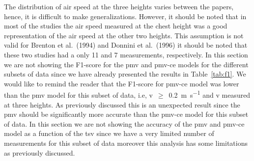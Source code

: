 The distribution of air speed at the three heights varies between the papers, hence, it is difficult to make generalizations.
However, it should be noted that in most of the studies the air speed measured at the chest height was a good representation of the air speed at the other two heights.
This assumption is not valid for Brenton et al.\ (1994) and Donnini et al.\ (1996) it should be noted that these two studies had a only \num{11} and \num{7} measurements, respectively.
In this section we are not showing the F1-score for the \ac{pmv} and \ac{pmv-ce} models for the different subsets of data since we have already presented the results in Table~\ref{tab:f1}.
We would like to remind the reader that the F1-score for \ac{pmv-ce} model was lower than the \ac{pmv} model for this subset of data, i.e, \ac{v}~$\geq$~\qty{0.2}{\m\per\s} and \ac{v} measured at three heights.
As previously discussed this is an unexpected result since the \ac{pmv} should be significantly more accurate than the \ac{pmv-ce} model for this subset of data.
In this section we are not showing the accuracy of the \ac{pmv} and \ac{pmv-ce} model as a function of the \ac{tsv} since we have a very limited number of measurements for this subset of data moreover this analysis has some limitations as previously discussed.

